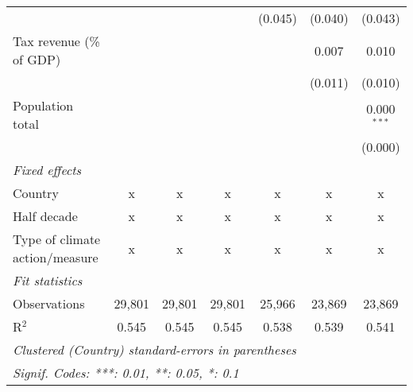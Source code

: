\begin{tabular}{lcccccc}
                                                                  &         &         &               & (0.045)      & (0.040)       & (0.043)\\   
   Tax revenue (\% of GDP)                                        &         &         &               &              & 0.007         & 0.010\\   
                                                                  &         &         &               &              & (0.011)       & (0.010)\\   
   Population total                                               &         &         &               &              &               & 0.000$^{***}$\\   
                                                                  &         &         &               &              &               & (0.000)\\   
   \emph{Fixed effects}\\
   Country                                                        & x       & x       & x             & x            & x             & x\\  
   Half decade                                                    & x       & x       & x             & x            & x             & x\\  
   Type of climate action/measure                                 & x       & x       & x             & x            & x             & x\\  
   \midrule \emph{Fit statistics}\\
   Observations                                                   & 29,801  & 29,801  & 29,801        & 25,966       & 23,869        & 23,869\\  
   R$^2$                                                          & 0.545   & 0.545   & 0.545         & 0.538        & 0.539         & 0.541\\  
   \midrule
   \multicolumn{7}{l}{\emph{Clustered (Country) standard-errors in parentheses}}\\
   \multicolumn{7}{l}{\emph{Signif. Codes: ***: 0.01, **: 0.05, *: 0.1}}\\
\end{tabular}
\par\endgroup


